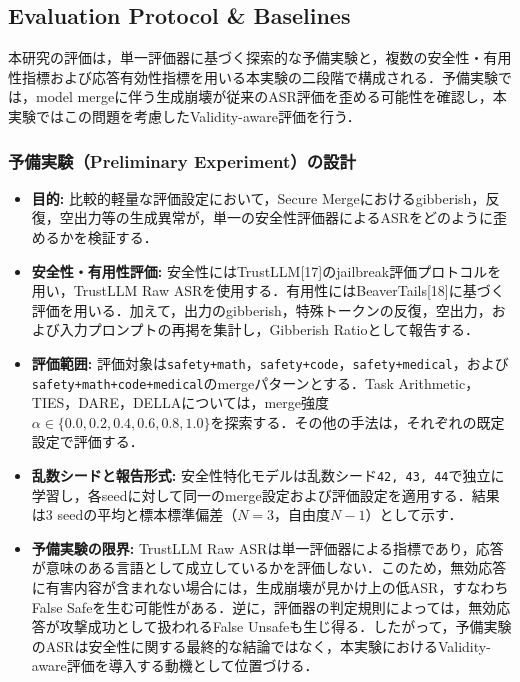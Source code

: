 \documentclass{article}
\begin{document}
\subsection{Evaluation Protocol \& Baselines}
\label{app:evaluation_protocol}

本研究の評価は，単一評価器に基づく探索的な予備実験と，複数の安全性・有用性指標および応答有効性指標を用いる本実験の二段階で構成される．予備実験では，model mergeに伴う生成崩壊が従来のASR評価を歪める可能性を確認し，本実験ではこの問題を考慮したValidity-aware評価を行う．

\subsubsection{予備実験（Preliminary Experiment）の設計}

\begin{itemize}
    \item \textbf{目的:}
    比較的軽量な評価設定において，Secure Mergeにおけるgibberish，反復，空出力等の生成異常が，単一の安全性評価器によるASRをどのように歪めるかを検証する．

    \item \textbf{安全性・有用性評価:}
    安全性にはTrustLLM[17]のjailbreak評価プロトコルを用い，TrustLLM Raw ASRを使用する．有用性にはBeaverTails[18]に基づく評価を用いる．加えて，出力のgibberish，特殊トークンの反復，空出力，および入力プロンプトの再掲を集計し，Gibberish Ratioとして報告する．

    \item \textbf{評価範囲:}
    評価対象は\texttt{safety+math}，\texttt{safety+code}，\texttt{safety+medical}，および\texttt{safety+math+code+medical}のmergeパターンとする．Task Arithmetic，TIES，DARE，DELLAについては，merge強度
    \(\alpha \in \{0.0, 0.2, 0.4, 0.6, 0.8, 1.0\}\)を探索する．その他の手法は，それぞれの既定設定で評価する．

    \item \textbf{乱数シードと報告形式:}
    安全性特化モデルは乱数シード\texttt{42, 43, 44}で独立に学習し，各seedに対して同一のmerge設定および評価設定を適用する．結果は3 seedの平均と標本標準偏差（\(N=3\)，自由度\(N-1\)）として示す．

    \item \textbf{予備実験の限界:}
    TrustLLM Raw ASRは単一評価器による指標であり，応答が意味のある言語として成立しているかを評価しない．このため，無効応答に有害内容が含まれない場合には，生成崩壊が見かけ上の低ASR，すなわちFalse Safeを生む可能性がある．逆に，評価器の判定規則によっては，無効応答が攻撃成功として扱われるFalse Unsafeも生じ得る．したがって，予備実験のASRは安全性に関する最終的な結論ではなく，本実験におけるValidity-aware評価を導入する動機として位置づける．
\end{itemize}
\end{document}
